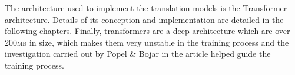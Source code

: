\documentclass[12pt,a4paper,twoside,openright]{report}
\newcommand{\red}[1]{\textcolor{red}{#1}}
\begin{document}
The architecture used to implement the translation models is the Transformer architecture\cite{transformers}. Details of its conception and implementation are detailed in the following chapters. Finally, transformers are a deep architecture which are over 200\textsc{mb} in size, which makes them very unstable in the training process and the investigation carried out by Popel \& Bojar in the article\cite{training-tips} helped guide the training process.




\end{document}
